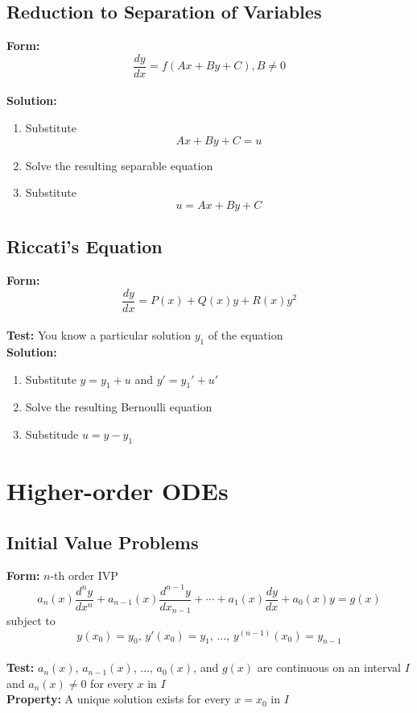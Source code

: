\documentclass{article}
\begin{document}
\subsection{Reduction to Separation of Variables}

\textbf{Form:} \[\frac{d y}{d x} = f(A x + B y + C), B \ne 0\] \\ \textbf{Solution:} \begin{enumerate}
  \item Substitute \[A x + B y + C = u\]

  \item Solve the resulting separable equation

  \item Substitute \[u = A x + B y + C\]
\end{enumerate}

\subsection{Riccati's Equation}

\textbf{Form:} \[\frac{dy}{dx} = P(x) + Q(x) y + R(x) y^2\] \\ \textbf{Test:} You know a particular solution $y_1$ of the equation \\ \textbf{Solution:} \begin{enumerate}
  \item Substitute $y = y_1 + u$ and $y' = y_1' + u'$

  \item Solve the resulting Bernoulli equation

  \item Substitude $u = y - y_1$
\end{enumerate}

\section{Higher-order ODEs}

\subsection{Initial Value Problems}

\textbf{Form:} $n$-th order IVP \[a_n(x) \frac{d^ny}{dx^n} + a_{n - 1}(x) \frac{d^{n - 1}y}{dx_{n - 1}} + \cdots + a_1(x) \frac{dy}{dx} + a_0(x) y = g(x)\] subject to \[y(x_0) = y_0, \,y'(x_0) = y_1, \,\ldots, \,y^{(n - 1)}(x_0) = y_{n - 1}\] \\ \textbf{Test:} $a_n(x)$, $a_{n - 1}(x)$, $\ldots$, $a_0(x)$, and $g(x)$ are continuous on an interval $I$ and $a_n(x) \ne 0$ for every $x$ in $I$ \\ \textbf{Property:} A unique solution exists for every $x = x_0$ in $I$
\end{document}
